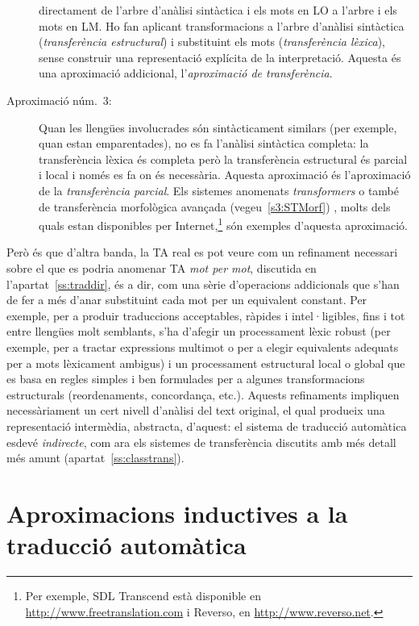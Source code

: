 \begin{description}
    directament de l'arbre d'anàlisi sintàctica i els mots en LO a
    l'arbre i els mots en LM. Ho fan aplicant transformacions a
    l'arbre d'anàlisi sintàctica (\emph{transferència estructural}) i
    substituint els mots (\emph{transferència lèxica}), sense
    construir una representació explícita de la interpretació. Aquesta
    és una aproximació addicional, l'\emph{aproximació de
      transferència}.
  \item[Aproximació núm.\ 3:] Quan les llengües involucrades són
    sintàcticament similars (per exemple, quan estan emparentades), no
    es fa l'anàlisi sintàctica completa: la transferència lèxica és
    completa però la transferència estructural és parcial i local i
    només es fa on és necessària.  Aquesta aproximació és
    l'aproximació de la \emph{transferència parcial}. Els sistemes
    anomenats \emph{transformers} o també de transferència morfològica
    avançada (vegeu~\ref{s3:STMorf}) \citep[4.2]{arnold94b}, molts
    dels quals estan disponibles per Internet,\footnote{Per exemple,
      SDL Transcend està disponible en
      \url{http://www.freetranslation.com} i Reverso, en
      \url{http://www.reverso.net}.} són exemples d'aquesta
    aproximació.
\end{description}

Però és que d'altra banda, la TA real es pot veure com un refinament
necessari sobre el que es podria anomenar TA \emph{mot per mot},
discutida en l'apartat~\ref{ss:traddir}, és a dir, com una sèrie
d'operacions addicionals que s'han de fer a més d'anar substituint
cada mot per un equivalent constant.  Per exemple, per a produir
traduccions acceptables, ràpides i intel·ligibles, fins i tot entre
llengües molt semblants, s'ha d'afegir un processament lèxic robust
(per exemple, per a tractar expressions multimot o per a elegir
equivalents adequats per a mots lèxicament ambigus) i un processament
estructural local o global que es basa en regles simples i ben
formulades per a algunes transformacions estructurals (reordenaments,
concordança, etc.). Aquests refinaments impliquen necessàriament un
cert nivell d'anàlisi del text original, el qual produeix una
representació intermèdia, abstracta, d'aquest: el sistema de traducció
automàtica esdevé \emph{indirecte}, com ara els sistemes de
transferència discutits amb més detall més amunt
(apartat~\ref{ss:classtrans}).


\section[Aproximacions inductives a la TA]{Aproximacions inductives a la traducció automàtica}
\label{ss:induc}

